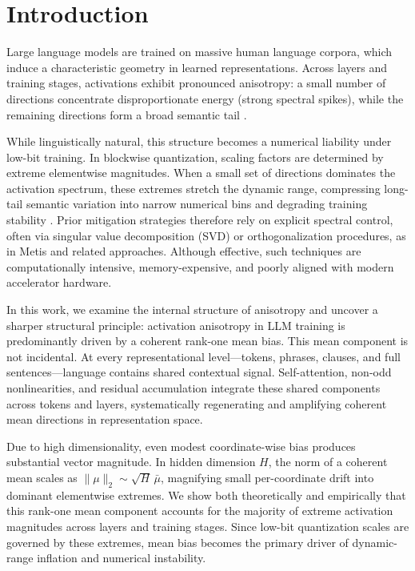 \section{Introduction}

Large language models are trained on massive human language corpora, which induce a characteristic geometry in learned representations. Across layers and training stages, activations exhibit pronounced anisotropy: a small number of directions concentrate disproportionate energy (strong spectral spikes), while the remaining directions form a broad semantic tail \citep{ethayarajh2019contextual, mu2018all, timkey2021rogue, kovaleva2021bertbusters, machina2024anisotropy}.

While linguistically natural, this structure becomes a numerical liability under low-bit training. In blockwise quantization, scaling factors are determined by extreme elementwise magnitudes. When a small set of directions dominates the activation spectrum, these extremes stretch the dynamic range, compressing long-tail semantic variation into narrow numerical bins and degrading training stability \citep{xiao2023smoothquant, frantar2022gptq, lin2024awq, li2024svdquant, ashkboos2024quarot}. Prior mitigation strategies therefore rely on explicit spectral control, often via singular value decomposition (SVD) or orthogonalization procedures, as in Metis \citep{cao2025metis} and related approaches. Although effective, such techniques are computationally intensive, memory-expensive, and poorly aligned with modern accelerator hardware.

In this work, we examine the internal structure of anisotropy and uncover a sharper structural principle: activation anisotropy in LLM training is predominantly driven by a coherent rank-one mean bias. This mean component is not incidental. At every representational level—tokens, phrases, clauses, and full sentences—language contains shared contextual signal. Self-attention, non-odd nonlinearities, and residual accumulation integrate these shared components across tokens and layers, systematically regenerating and amplifying coherent mean directions in representation space.

Due to high dimensionality, even modest coordinate-wise bias produces substantial vector magnitude. In hidden dimension $H$, the norm of a coherent mean scales as $\|\mu\|_2 \sim \sqrt{H}\,\bar{\mu}$, magnifying small per-coordinate drift into dominant elementwise extremes. We show both theoretically and empirically that this rank-one mean component accounts for the majority of extreme activation magnitudes across layers and training stages. Since low-bit quantization scales are governed by these extremes, mean bias becomes the primary driver of dynamic-range inflation and numerical instability.

